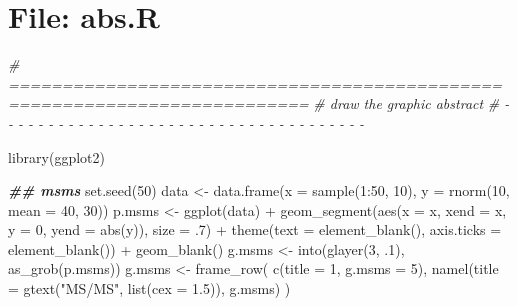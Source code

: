 \documentclass[
]{article}
\newenvironment{Shaded}{\begin{snugshade}}{\end{snugshade}}
\newcommand{\AttributeTok}[1]{\textcolor[rgb]{0.77,0.63,0.00}{#1}}
\newcommand{\CommentTok}[1]{\textcolor[rgb]{0.56,0.35,0.01}{\textit{#1}}}
\newcommand{\DecValTok}[1]{\textcolor[rgb]{0.00,0.00,0.81}{#1}}
\newcommand{\DocumentationTok}[1]{\textcolor[rgb]{0.56,0.35,0.01}{\textbf{\textit{#1}}}}
\newcommand{\FloatTok}[1]{\textcolor[rgb]{0.00,0.00,0.81}{#1}}
\newcommand{\FunctionTok}[1]{\textcolor[rgb]{0.00,0.00,0.00}{#1}}
\newcommand{\NormalTok}[1]{#1}
\newcommand{\OtherTok}[1]{\textcolor[rgb]{0.56,0.35,0.01}{#1}}
\newcommand{\SpecialCharTok}[1]{\textcolor[rgb]{0.00,0.00,0.00}{#1}}
\newcommand{\StringTok}[1]{\textcolor[rgb]{0.31,0.60,0.02}{#1}}
\begin{document}
\hypertarget{file-abs.r}{%
\section{File: abs.R}\label{file-abs.r}}

\begin{Shaded}
\begin{Highlighting}[]
\CommentTok{\# ==========================================================================}
\CommentTok{\# draw the graphic abstract}
\CommentTok{\# {-} {-} {-} {-} {-} {-} {-} {-} {-} {-} {-} {-} {-} {-} {-} {-} {-} {-} {-} {-} {-} {-} {-} {-} {-} {-} {-} {-} {-} {-} {-} {-} {-} {-} {-} {-} {-}}

\FunctionTok{library}\NormalTok{(ggplot2)}

\DocumentationTok{\#\# msms}
\FunctionTok{set.seed}\NormalTok{(}\DecValTok{50}\NormalTok{)}
\NormalTok{data }\OtherTok{\textless{}{-}} \FunctionTok{data.frame}\NormalTok{(}\AttributeTok{x =} \FunctionTok{sample}\NormalTok{(}\DecValTok{1}\SpecialCharTok{:}\DecValTok{50}\NormalTok{, }\DecValTok{10}\NormalTok{), }\AttributeTok{y =} \FunctionTok{rnorm}\NormalTok{(}\DecValTok{10}\NormalTok{, }\AttributeTok{mean =} \DecValTok{40}\NormalTok{, }\DecValTok{30}\NormalTok{))}
\NormalTok{p.msms }\OtherTok{\textless{}{-}} \FunctionTok{ggplot}\NormalTok{(data) }\SpecialCharTok{+}
  \FunctionTok{geom\_segment}\NormalTok{(}\FunctionTok{aes}\NormalTok{(}\AttributeTok{x =}\NormalTok{ x, }\AttributeTok{xend =}\NormalTok{ x, }\AttributeTok{y =} \DecValTok{0}\NormalTok{, }\AttributeTok{yend =} \FunctionTok{abs}\NormalTok{(y)), }\AttributeTok{size =}\NormalTok{ .}\DecValTok{7}\NormalTok{) }\SpecialCharTok{+}
  \FunctionTok{theme}\NormalTok{(}\AttributeTok{text =} \FunctionTok{element\_blank}\NormalTok{(), }
    \AttributeTok{axis.ticks =} \FunctionTok{element\_blank}\NormalTok{()) }\SpecialCharTok{+}
  \FunctionTok{geom\_blank}\NormalTok{()}
\NormalTok{g.msms }\OtherTok{\textless{}{-}} \FunctionTok{into}\NormalTok{(}\FunctionTok{glayer}\NormalTok{(}\DecValTok{3}\NormalTok{, .}\DecValTok{1}\NormalTok{), }\FunctionTok{as\_grob}\NormalTok{(p.msms))}
\NormalTok{g.msms }\OtherTok{\textless{}{-}} \FunctionTok{frame\_row}\NormalTok{(}
  \FunctionTok{c}\NormalTok{(}\AttributeTok{title =} \DecValTok{1}\NormalTok{, }\AttributeTok{g.msms =} \DecValTok{5}\NormalTok{),}
  \FunctionTok{namel}\NormalTok{(}\AttributeTok{title =} \FunctionTok{gtext}\NormalTok{(}\StringTok{"MS/MS"}\NormalTok{, }\FunctionTok{list}\NormalTok{(}\AttributeTok{cex =} \FloatTok{1.5}\NormalTok{)), g.msms)}
\NormalTok{)}


\end{Highlighting}
\end{Shaded}
\end{document}
